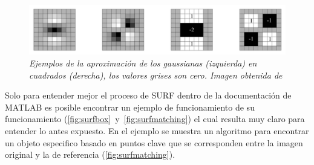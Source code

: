 \begin{figure}[htc]
  \centering
  \includegraphics[scale=.6]{images/gaussian}
  \caption{\em Ejemplos de la aproximación de los gaussianas (izquierda) en cuadrados (derecha), los valores grises son cero. Imagen obtenida de \cite{Bay2006} }  
  \label{fig:gaussians}
\end{figure}

Solo para entender mejor el proceso de SURF dentro de la documentación de MATLAB es posible encontrar un ejemplo de  funcionamiento de su funcionamiento (\ref{fig:surfbox}~y~\ref{fig:surfmatching}) el cual resulta muy claro para entender lo antes expuesto. En el ejemplo se muestra un algoritmo para encontrar un objeto especifico basado en puntos clave que se corresponden entre la imagen original y la de referencia (\ref{fig:surfmatching}).

